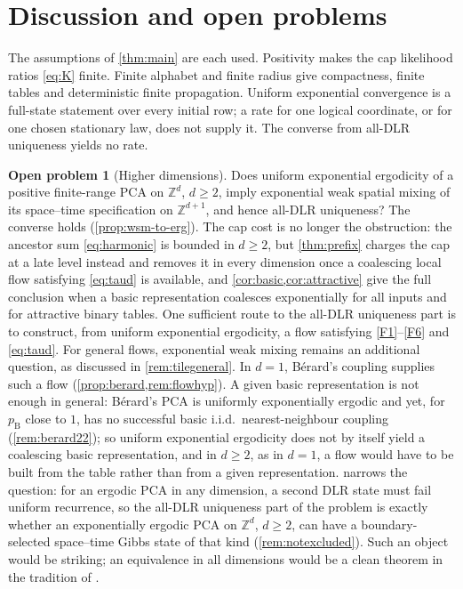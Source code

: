 \documentclass[11pt]{article}
\theoremstyle{plain}
\theoremstyle{definition}
\newtheorem{problem}[theorem]{Open problem}
\theoremstyle{remark}
\newcommand{\Z}{\mathbb{Z}}
\begin{document}
\section{Discussion and open problems}
\label{sec:discussion}

The assumptions of \cref{thm:main} are each used. Positivity makes the cap likelihood ratios \eqref{eq:K} finite. Finite alphabet and finite radius give compactness, finite tables and deterministic finite propagation. Uniform exponential convergence is a full-state statement over every initial row; a rate for one logical coordinate, or for one chosen stationary law, does not supply it. The converse from all-DLR uniqueness yields no rate.

\begin{problem}[Higher dimensions]
\label{prob:higher}
Does uniform exponential ergodicity of a positive finite-range PCA on $\Z^d$, $d\ge2$, imply exponential weak spatial mixing of its space--time specification on $\Z^{d+1}$, and hence all-DLR uniqueness? The converse holds (\cref{prop:wsm-to-erg}). The cap cost is no longer the obstruction: the ancestor sum \eqref{eq:harmonic} is bounded in $d\ge2$, but \cref{thm:prefix} charges the cap at a late level instead and removes it in every dimension once a coalescing local flow satisfying \eqref{eq:taud} is available, and \cref{cor:basic,cor:attractive} give the full conclusion when a basic representation coalesces exponentially for all inputs and for attractive binary tables. One sufficient route to the all-DLR uniqueness part is to construct, from uniform exponential ergodicity, a flow satisfying \ref{F1}--\ref{F6} and \eqref{eq:taud}. For general flows, exponential weak mixing remains an additional question, as discussed in \cref{rem:tilegeneral}. In $d=1$, B\'erard's coupling supplies such a flow (\cref{prop:berard,rem:flowhyp}). A given basic representation is not enough in general: B\'erard's PCA \cite{Berard22} is uniformly exponentially ergodic \cite[Proposition~1]{Berard22} and yet, for $p_{\mathrm B}$ close to $1$, has no successful basic i.i.d.\ nearest-neighbour coupling \cite[Theorem~1]{Berard22} (\cref{rem:berard22}); so uniform exponential ergodicity does not by itself yield a coalescing basic representation, and in $d\ge2$, as in $d=1$, a flow would have to be built from the table rather than from a given representation.  narrows the question: for an ergodic PCA in any dimension, a second DLR state must fail uniform recurrence, so the all-DLR uniqueness part of the problem is exactly whether an exponentially ergodic PCA on $\Z^d$, $d\ge2$, can have a boundary-selected space--time Gibbs state of that kind (\cref{rem:notexcluded}). Such an object would be striking; an equivalence in all dimensions would be a clean theorem in the tradition of \cite{DS85,MOS94}.
\end{problem}
\end{document}
